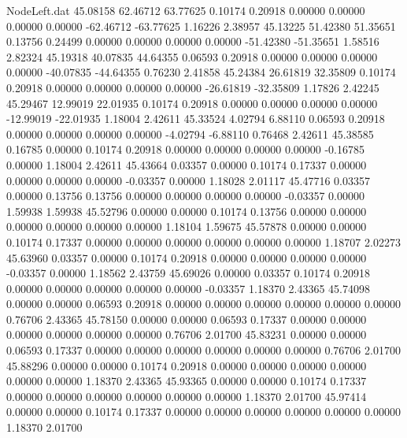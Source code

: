 \begin{filecontents}{NodeLeft.dat}
  45.08158   62.46712   63.77625     0.10174    0.20918    0.00000    0.00000    0.00000    0.00000  -62.46712  -63.77625    1.16226    2.38957
  45.13225   51.42380   51.35651     0.13756    0.24499    0.00000    0.00000    0.00000    0.00000  -51.42380  -51.35651    1.58516    2.82324
  45.19318   40.07835   44.64355     0.06593    0.20918    0.00000    0.00000    0.00000    0.00000  -40.07835  -44.64355    0.76230    2.41858
  45.24384   26.61819   32.35809     0.10174    0.20918    0.00000    0.00000    0.00000    0.00000  -26.61819  -32.35809    1.17826    2.42245
  45.29467   12.99019   22.01935     0.10174    0.20918    0.00000    0.00000    0.00000    0.00000  -12.99019  -22.01935    1.18004    2.42611
  45.33524    4.02794    6.88110     0.06593    0.20918    0.00000    0.00000    0.00000    0.00000   -4.02794   -6.88110    0.76468    2.42611
  45.38585    0.16785    0.00000     0.10174    0.20918    0.00000    0.00000    0.00000    0.00000   -0.16785    0.00000    1.18004    2.42611
  45.43664    0.03357    0.00000     0.10174    0.17337    0.00000    0.00000    0.00000    0.00000   -0.03357    0.00000    1.18028    2.01117
  45.47716    0.03357    0.00000     0.13756    0.13756    0.00000    0.00000    0.00000    0.00000   -0.03357    0.00000    1.59938    1.59938
  45.52796    0.00000    0.00000     0.10174    0.13756    0.00000    0.00000    0.00000    0.00000    0.00000    0.00000    1.18104    1.59675
  45.57878    0.00000    0.00000     0.10174    0.17337    0.00000    0.00000    0.00000    0.00000    0.00000    0.00000    1.18707    2.02273
  45.63960    0.03357    0.00000     0.10174    0.20918    0.00000    0.00000    0.00000    0.00000   -0.03357    0.00000    1.18562    2.43759
  45.69026    0.00000    0.03357     0.10174    0.20918    0.00000    0.00000    0.00000    0.00000    0.00000   -0.03357    1.18370    2.43365
  45.74098    0.00000    0.00000     0.06593    0.20918    0.00000    0.00000    0.00000    0.00000    0.00000    0.00000    0.76706    2.43365
  45.78150    0.00000    0.00000     0.06593    0.17337    0.00000    0.00000    0.00000    0.00000    0.00000    0.00000    0.76706    2.01700
  45.83231    0.00000    0.00000     0.06593    0.17337    0.00000    0.00000    0.00000    0.00000    0.00000    0.00000    0.76706    2.01700
  45.88296    0.00000    0.00000     0.10174    0.20918    0.00000    0.00000    0.00000    0.00000    0.00000    0.00000    1.18370    2.43365
  45.93365    0.00000    0.00000     0.10174    0.17337    0.00000    0.00000    0.00000    0.00000    0.00000    0.00000    1.18370    2.01700
  45.97414    0.00000    0.00000     0.10174    0.17337    0.00000    0.00000    0.00000    0.00000    0.00000    0.00000    1.18370    2.01700

\end{filecontents}
